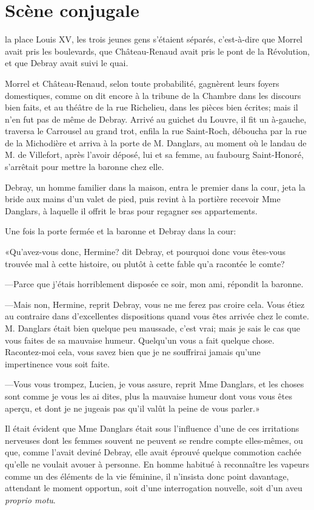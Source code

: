 \chapter{Scène conjugale} 

\lettrine{}{} la place Louis XV, les trois jeunes gens s'étaient séparés, c'est-à-dire que Morrel avait pris les boulevards, que Château-Renaud avait pris le pont de la Révolution, et que Debray avait suivi le quai. 

Morrel et Château-Renaud, selon toute probabilité, gagnèrent leurs foyers domestiques, comme on dit encore à la tribune de la Chambre dans les discours bien faits, et au théâtre de la rue Richelieu, dans les pièces bien écrites; mais il n'en fut pas de même de Debray. Arrivé au guichet du Louvre, il fit un à-gauche, traversa le Carrousel au grand trot, enfila la rue Saint-Roch, déboucha par la rue de la Michodière et arriva à la porte de M. Danglars, au moment où le landau de M. de Villefort, après l'avoir déposé, lui et sa femme, au faubourg Saint-Honoré, s'arrêtait pour mettre la baronne chez elle. 

Debray, un homme familier dans la maison, entra le premier dans la cour, jeta la bride aux mains d'un valet de pied, puis revint à la portière recevoir Mme Danglars, à laquelle il offrit le bras pour regagner ses appartements. 

Une fois la porte fermée et la baronne et Debray dans la cour: 

«Qu'avez-vous donc, Hermine? dit Debray, et pourquoi donc vous êtes-vous trouvée mal à cette histoire, ou plutôt à cette fable qu'a racontée le comte? 

—Parce que j'étais horriblement disposée ce soir, mon ami, répondit la baronne. 

—Mais non, Hermine, reprit Debray, vous ne me ferez pas croire cela. Vous étiez au contraire dans d'excellentes dispositions quand vous êtes arrivée chez le comte. M. Danglars était bien quelque peu maussade, c'est vrai; mais je sais le cas que vous faites de sa mauvaise humeur. Quelqu'un vous a fait quelque chose. Racontez-moi cela, vous savez bien que je ne souffrirai jamais qu'une impertinence vous soit faite. 

—Vous vous trompez, Lucien, je vous assure, reprit Mme Danglars, et les choses sont comme je vous les ai dites, plus la mauvaise humeur dont vous vous êtes aperçu, et dont je ne jugeais pas qu'il valût la peine de vous parler.» 

Il était évident que Mme Danglars était sous l'influence d'une de ces irritations nerveuses dont les femmes souvent ne peuvent se rendre compte elles-mêmes, ou que, comme l'avait deviné Debray, elle avait éprouvé quelque commotion cachée qu'elle ne voulait avouer à personne. En homme habitué à reconnaître les vapeurs comme un des éléments de la vie féminine, il n'insista donc point davantage, attendant le moment opportun, soit d'une interrogation nouvelle, soit d'un aveu \textit{proprio motu}. 

